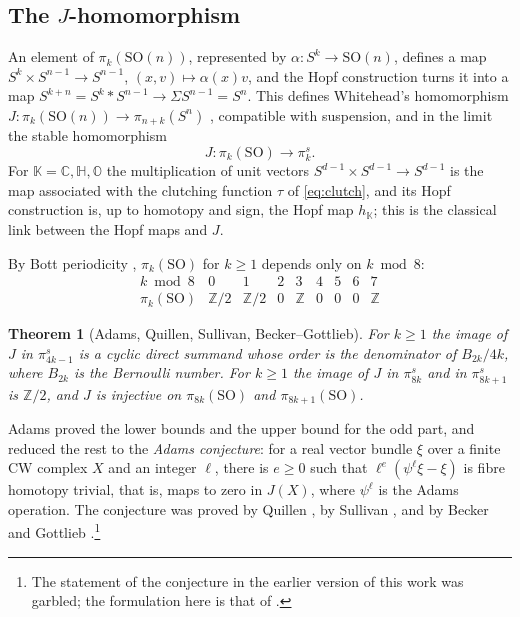 \documentclass[11pt]{amsart}
\numberwithin{equation}{section}
\theoremstyle{plain}
\newtheorem{theorem}{Theorem}[section]
\theoremstyle{definition}
\theoremstyle{remark}
\newcommand{\C}{\mathbb{C}}
\newcommand{\Hq}{\mathbb{H}}
\newcommand{\Oc}{\mathbb{O}}
\newcommand{\K}{\mathbb{K}}
\newcommand{\Z}{\mathbb{Z}}
\newcommand{\SO}{\mathrm{SO}}
\begin{document}
\subsection{The \texorpdfstring{$J$}{J}-homomorphism}\label{sec:J}

An element of $\pi_k(\SO(n))$, represented by $\alpha\colon S^k\to\SO(n)$, defines a map $S^k\times S^{n-1}\to S^{n-1}$, $(x,v)\mapsto\alpha(x)v$, and the Hopf construction turns it into a map $S^{k+n}=S^k*S^{n-1}\to\Sigma S^{n-1}=S^n$. This defines Whitehead's homomorphism $J\colon\pi_k(\SO(n))\to\pi_{n+k}(S^n)$ \cite{Whi42}, compatible with suspension, and in the limit the stable homomorphism
\[
J\colon\pi_k(\SO)\to\pi_k^s .
\]
For $\K=\C,\Hq,\Oc$ the multiplication of unit vectors $S^{d-1}\times S^{d-1}\to S^{d-1}$ is the map associated with the clutching function $\tau$ of \eqref{eq:clutch}, and its Hopf construction is, up to homotopy and sign, the Hopf map $h_\K$; this is the classical link between the Hopf maps and $J$.

By Bott periodicity \cite{Bot59}, $\pi_k(\SO)$ for $k\ge1$ depends only on $k\bmod8$:
\[
\begin{array}{c|cccccccc}
k\bmod 8 & 0&1&2&3&4&5&6&7\\\hline
\pi_k(\SO) & \Z/2&\Z/2&0&\Z&0&0&0&\Z
\end{array}
\]

\begin{theorem}[Adams, Quillen, Sullivan, Becker--Gottlieb]\label{thm:imJ}
For $k\ge1$ the image of $J$ in $\pi_{4k-1}^s$ is a cyclic direct summand whose order is the denominator of $B_{2k}/4k$, where $B_{2k}$ is the Bernoulli number. For $k\ge1$ the image of $J$ in $\pi_{8k}^s$ and in $\pi_{8k+1}^s$ is $\Z/2$, and $J$ is injective on $\pi_{8k}(\SO)$ and $\pi_{8k+1}(\SO)$.
\end{theorem}

Adams \cite{Ada66} proved the lower bounds and the upper bound for the odd part, and reduced the rest to the \emph{Adams conjecture}: for a real vector bundle $\xi$ over a finite CW complex $X$ and an integer $\ell$, there is $e\ge0$ such that $\ell^e(\psi^\ell\xi-\xi)$ is fibre homotopy trivial, that is, maps to zero in $J(X)$, where $\psi^\ell$ is the Adams operation. The conjecture was proved by Quillen \cite{Qui71}, by Sullivan \cite{Sul74}, and by Becker and Gottlieb \cite{BG75}.\footnote{The statement of the conjecture in the earlier version of this work was garbled; the formulation here is that of \cite{Ada66}.}
\end{document}
